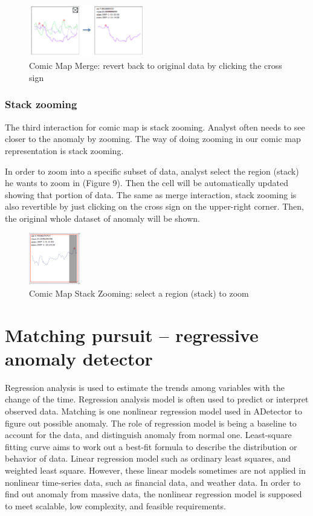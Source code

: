 \documentclass{vgtc}                          %
\begin{document}
\begin{figure}[htb]
	\centering
	\includegraphics[width=0.45\textwidth]{merge2.jpg}
	\caption{Comic Map Merge: revert back to original data by clicking the cross sign}
\end{figure}

\subsubsection{Stack zooming}
The third interaction for comic map is stack zooming. Analyst often needs to see closer to the anomaly by zooming. The way of doing zooming in our comic map representation is stack zooming.

In order to zoom into a specific subset of data, analyst select the region (stack) he wants to zoom in (Figure 9). Then the cell will be automatically updated showing that portion of data. 
The same as merge interaction, stack zooming is also revertible by just clicking on the cross sign on the upper-right corner. Then, the original whole dataset of anomaly will be shown.

\begin{figure}[htb]
	\centering
	\includegraphics[width=0.20\textwidth]{zoom.jpg}
	\caption{Comic Map Stack Zooming: select a region (stack) to zoom}
\end{figure}

\section{Matching pursuit -- regressive anomaly detector}

Regression analysis is used to estimate the trends among variables with the change of the time. Regression analysis model is often used to predict or interpret observed data. Matching is one nonlinear regression model used in ADetector to figure out possible anomaly. The role of regression model is being a baseline to account for the data, and distinguish anomaly from normal one. Least-square fitting curve aims to work out a best-fit formula to describe the distribution or behavior of data. Linear regression model such as ordinary least squares, and weighted least square. However, these linear models sometimes are not applied in nonlinear time-series data, such as financial data, and weather data. In order to find out anomaly from massive data, the nonlinear regression model is supposed to meet scalable, low complexity, and feasible requirements.
\end{document}

